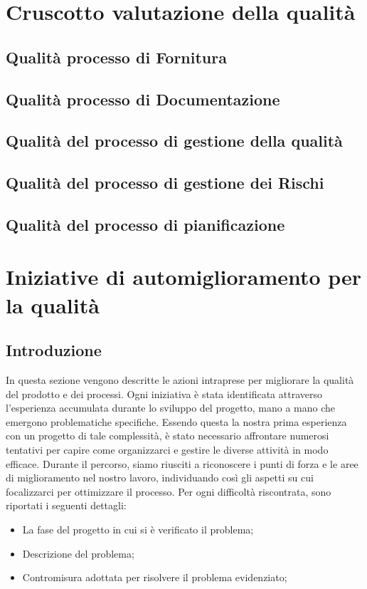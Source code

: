 \documentclass{article}
\begin{document}
\section{Cruscotto valutazione della qualità}


\subsection{Qualità processo di Fornitura}


\subsection{Qualità processo di Documentazione}


\subsection{Qualità del processo di gestione della qualità}


\subsection{Qualità del processo di gestione dei Rischi}


\subsection{Qualità del processo di pianificazione}

\newpage
\section{Iniziative di automiglioramento per la qualità}
\subsection{Introduzione}
In questa sezione vengono descritte le azioni intraprese per migliorare la qualità del prodotto e dei processi. 
Ogni iniziativa è stata identificata attraverso l’esperienza accumulata durante lo sviluppo del progetto, mano a mano che emergono problematiche specifiche. 
Essendo questa la nostra prima esperienza con un progetto di tale complessità, è stato necessario affrontare numerosi tentativi per capire come organizzarci e gestire le diverse attività in modo efficace. 
Durante il percorso, siamo riusciti a riconoscere i punti di forza e le aree di miglioramento nel nostro lavoro, individuando così gli aspetti su cui focalizzarci per ottimizzare il processo. 
Per ogni difficoltà riscontrata, sono riportati i seguenti dettagli:
\begin{itemize}
    \item La fase del progetto in cui si è verificato il problema;
    \item Descrizione del problema;
    \item Contromisura adottata per risolvere il problema evidenziato;
\end{itemize}
\end{document}
